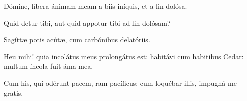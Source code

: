 \item {}

\item Dómine, líbera ánimam meam a biis iníquis,\psstar{} et a lin dolósa.

\item Quid detur tibi, aut quid appotur tibi\psstar{} ad lin dolósam?

\item Sagíttæ potis acútæ,\psstar{} cum carbónibus delatóriis.

\item Heu mihi! quia incolátus meus prolongátus est: habitávi cum habitibus Cedar:\psstar{} multum íncola fuit áma mea.

\item Cum his, qui odérunt pacem, ram pacíficus:\psstar{} cum loquébar illis, impugná me gratis.